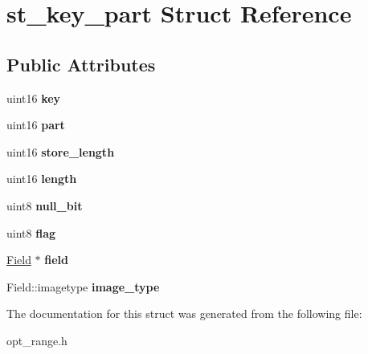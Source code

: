 \hypertarget{structst__key__part}{}\section{st\+\_\+key\+\_\+part Struct Reference}
\label{structst__key__part}
\subsection*{Public Attributes}
\begin{DoxyCompactItemize}
\item 
\mbox{\label{structst__key__part_afdf46cceae26442f17a96b9be2866342}} 
uint16 {\bfseries key}
\item 
\mbox{\label{structst__key__part_ab9958e16ced4b9e94b66f3e7bfd42833}} 
uint16 {\bfseries part}
\item 
\mbox{\label{structst__key__part_a3f0ebc50fee050bfa931a7bf70b3c32f}} 
uint16 {\bfseries store\+\_\+length}
\item 
\mbox{\label{structst__key__part_aabd5b22bd771b2fe98e42ebec66bb6f3}} 
uint16 {\bfseries length}
\item 
\mbox{\label{structst__key__part_a89c2af3b163d852f790c111f1ce6b019}} 
uint8 {\bfseries null\+\_\+bit}
\item 
\mbox{\label{structst__key__part_a108f7177d32a4cb0099ea691285cdb2a}} 
uint8 {\bfseries flag}
\item 
\mbox{\label{structst__key__part_a718f57761e868ca8f18aa7a5e24a9474}} 
\mbox{\hyperlink{classField}{Field}} $\ast$ {\bfseries field}
\item 
\mbox{\label{structst__key__part_a83df7fe137f7358e6f293827b4c3ce18}} 
Field\+::imagetype {\bfseries image\+\_\+type}
\end{DoxyCompactItemize}


The documentation for this struct was generated from the following file\+:\begin{DoxyCompactItemize}
\item 
opt\+\_\+range.\+h\end{DoxyCompactItemize}
